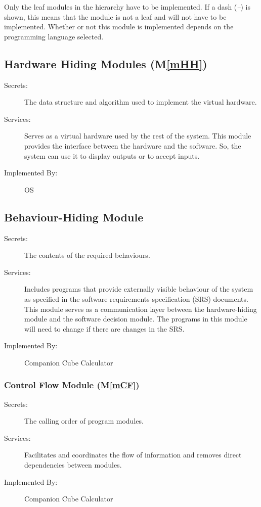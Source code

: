 \documentclass[12pt, titlepage]{article}
\newcommand{\mref}[1]{M\ref{#1}}
\newcommand{\progname}{Companion Cube Calculator} %
\begin{document}
Only the leaf modules in the
hierarchy have to be implemented. If a dash (\emph{--}) is shown, this means
that the module is not a leaf and will not have to be implemented. Whether or
not this module is implemented depends on the programming language
selected.

\subsection{Hardware Hiding Modules (\mref{mHH})}

\begin{description}
\item[Secrets:]The data structure and algorithm used to implement the virtual
  hardware.
\item[Services:]Serves as a virtual hardware used by the rest of the
  system. This module provides the interface between the hardware and the
  software. So, the system can use it to display outputs or to accept inputs.
\item[Implemented By:] OS
\end{description}

\subsection{Behaviour-Hiding Module}

\begin{description}
\item[Secrets:]The contents of the required behaviours.
\item[Services:]Includes programs that provide externally visible behaviour of
  the system as specified in the software requirements specification (SRS)
  documents. This module serves as a communication layer between the
  hardware-hiding module and the software decision module. The programs in this
  module will need to change if there are changes in the SRS.
\item[Implemented By:] \progname{}
\end{description}

\subsubsection{Control Flow Module (\mref{mCF})}

\begin{description}
	\item[Secrets:] The calling order of program modules.
	\item[Services:] Facilitates and coordinates the flow of information 
	and removes direct dependencies between modules.
	\item[Implemented By:] \progname{}
\end{description}
\end{document}
